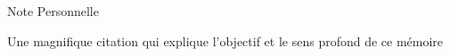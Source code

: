 \thispagestyle{empty}
\begin{center}
\Large{Note Personnelle}

\large{Une magnifique citation qui explique l'objectif et le sens profond de ce mémoire}
\end{center}

\setlength{\abovedisplayskip}{-5pt}
\setlength{\abovedisplayshortskip}{-5pt}
